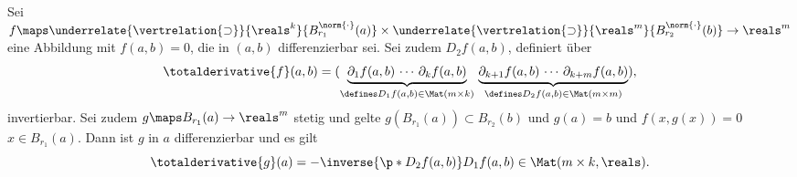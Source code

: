 \begin{satz}\label{funktion_ableiten_mit_hoeheren_abbildungen}
  Sei \( f\maps \underrelate{\vertrelation{\supset}}{\reals^k}{B_{r_1}^{\norm{\cdot}}(a)}\times \underrelate{\vertrelation{\supset}}{\reals^m}{B_{r_2}^{\norm{\cdot}}(b)}\to \reals^m \) eine Abbildung mit \( f(a,b)=0 \), die in \( (a,b) \) differenzierbar sei. Sei zudem \( D_2 f(a,b) \), definiert über
  \begin{equation*}
    \totalderivative{f}(a,b)=(\underbrace{\partial_1 f(a,b)\, \cdots\,  \partial_k f(a,b)}_{\defines D_1 f(a,b)\in \Mat(m\times k)}\, \underbrace{\partial_{k+1}f(a,b)\, \cdots\, \partial_{k+m}f(a,b)}_{\defines D_2 f(a,b)\in \Mat(m\times m)}),
  \end{equation*}
  invertierbar. Sei zudem \( g\maps B_{r_1}(a)\to \reals^m \) stetig und gelte \( g(B_{r_1}(a))\subset B_{r_2}(b) \) und \( g(a)=b \) und \( f(x,g(x))=0 \) \tforall \( x\in B_{r_1}(a) \). Dann ist \( g \) in \( a \) differenzierbar und es gilt
  \begin{equation*}
    \totalderivative{g}(a)=-\inverse{\p*{ D_2f(a,b) }}D_1 f(a,b)\in \Mat(m\times k, \reals).
  \end{equation*}
\end{satz}
